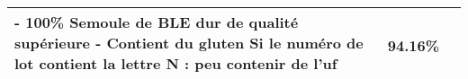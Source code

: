 \begin{longtable}{p{7cm}p{7cm}c}
                                                                                                                                                                                                                                                                                                                                                                                                                                                                                                                                                                                                                                                                                                                                                                                                                                                                                                                                              - 100\% Semoule de BLE dur de qualité supérieure \newline - Contient du gluten \newline Si le numéro de lot contient la lettre N : peu contenir de l'uf &   94.16\% \\ \hline

\end{longtable}
